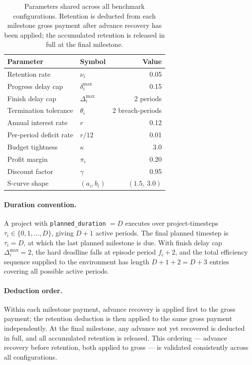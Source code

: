 \begin{table}[htbp]
  \centering\small
  \renewcommand{\arraystretch}{1.3}
  \setlength{\tabcolsep}{6pt}
  \begin{tabular}{llr}
    \toprule
    \textbf{Parameter} & \textbf{Symbol} & \textbf{Value} \\
    \midrule
    Retention rate            & $\nu_i$              & 0.05 \\
    Progress delay cap        & $\delta^{\max}_i$    & 0.15 \\
    Finish delay cap          & $\Delta^{\max}_i$    & 2 periods \\
    Termination tolerance     & $\theta_i$           & 2 breach-periods \\
    Annual interest rate      & $r$                  & 0.12 \\
    Per-period deficit rate   & $r/12$               & 0.01 \\
    Budget tightness          & $\kappa$             & 3.0 \\
    Profit margin             & $\pi_i$              & 0.20 \\
    Discount factor           & $\gamma$             & 0.95 \\
    S-curve shape             & $(a_i, b_i)$         & $(1.5,\ 3.0)$ \\
    \bottomrule
  \end{tabular}
  \caption{Parameters shared across all benchmark configurations.
    Retention is deducted from each milestone gross payment after
    advance recovery has been applied; the accumulated retention is
    released in full at the final milestone.}
  \label{tab:shared_params}
\end{table}

\paragraph{Duration convention.}
A project with \texttt{planned\_duration} $= D$ executes over
project-timesteps $\tau_i \in \{0, 1, \ldots, D\}$, giving $D+1$
active periods. The final planned timestep is $\tau_i = D$, at which
the last planned milestone is due. With finish delay cap
$\Delta^{\max}_i = 2$, the hard deadline falls at episode period
$f_i + 2$, and the total efficiency sequence supplied to the
environment has length $D + 1 + 2 = D + 3$ entries covering all
possible active periods.

\paragraph{Deduction order.}
Within each milestone payment, advance recovery is applied first to
the gross payment; the retention deduction is then applied to the same
gross payment independently. At the final milestone, any advance not
yet recovered is deducted in full, and all accumulated retention is
released. This ordering --- advance recovery before retention, both
applied to gross --- is validated consistently across all configurations.

